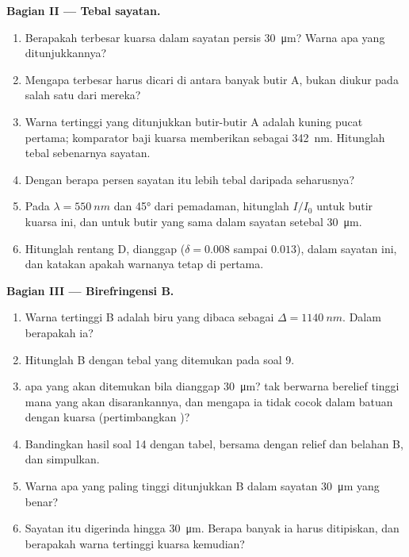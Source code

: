 \begin{problem}
\medskip
\noindent\textbf{Bagian II --- Tebal sayatan.}
\begin{enumerate}[resume]
  \item Berapakah  terbesar kuarsa dalam sayatan persis \qty{30}{\micro m}? Warna apa yang ditunjukkannya?
  \item Mengapa  terbesar harus dicari di antara banyak butir A, bukan diukur pada salah satu dari mereka?
  \item Warna tertinggi yang ditunjukkan butir-butir A adalah kuning pucat  pertama; komparator baji kuarsa memberikan  sebagai \qty{342}{nm}. Hitunglah tebal sebenarnya sayatan.
  \item Dengan berapa persen sayatan itu lebih tebal daripada seharusnya?
  \item Pada $\lambda = \qty{550}{nm}$ dan \ang{45} dari pemadaman, hitunglah $I/I_0$ untuk butir kuarsa ini, dan untuk butir yang sama dalam sayatan setebal \qty{30}{\micro m}.
  \item Hitunglah rentang  D, dianggap  ($\delta = 0.008$ sampai $0.013$), dalam sayatan ini, dan katakan apakah warnanya tetap di  pertama.
\end{enumerate}

\medskip
\noindent\textbf{Bagian III --- Birefringensi B.}
\begin{enumerate}[resume]
  \item Warna tertinggi B adalah biru yang dibaca sebagai $\Delta = \qty{1140}{nm}$. Dalam  berapakah ia?
  \item Hitunglah  B dengan tebal yang ditemukan pada soal 9.
  \item {} apa yang akan ditemukan bila dianggap \qty{30}{\micro m}?  tak berwarna berelief tinggi mana yang akan disarankannya, dan mengapa ia tidak cocok dalam batuan dengan kuarsa (pertimbangkan )?
  \item Bandingkan hasil soal 14 dengan tabel, bersama dengan relief dan belahan B, dan simpulkan.
  \item Warna apa yang paling tinggi ditunjukkan B dalam sayatan \qty{30}{\micro m} yang benar?
  \item Sayatan itu digerinda hingga \qty{30}{\micro m}. Berapa banyak ia harus ditipiskan, dan berapakah warna tertinggi kuarsa kemudian?
\end{enumerate}


\end{problem}
